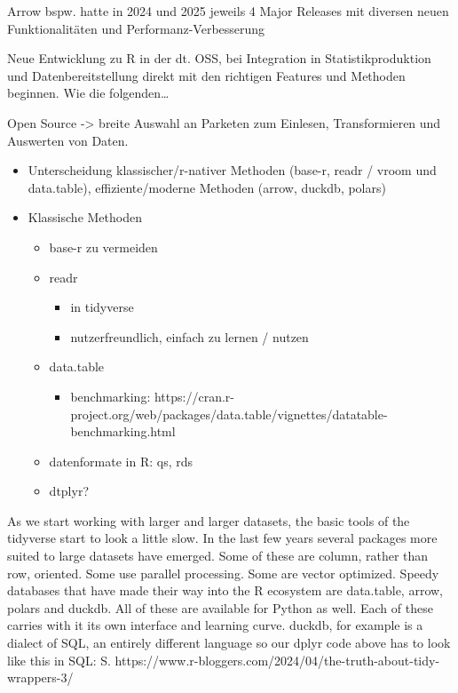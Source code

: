 \documentclass[
  german,
  10pt,
  twoside]{article}
\providecommand{\tightlist}{%
  \setlength{\itemsep}{0pt}\setlength{\parskip}{0pt}}
\begin{document}
Arrow bspw. hatte in 2024 und 2025 jeweils 4 Major Releases mit diversen
neuen Funktionalitäten und Performanz-Verbesserung

Neue Entwicklung zu R in der dt. OSS, bei Integration in
Statistikproduktion und Datenbereitstellung direkt mit den richtigen
Features und Methoden beginnen. Wie die folgenden\ldots{}

Open Source -\textgreater{} breite Auswahl an Parketen zum Einlesen,
Transformieren und Auswerten von Daten.

\begin{itemize}
\tightlist
\item
  Unterscheidung klassischer/r-nativer Methoden (base-r, readr / vroom
  und data.table), effiziente/moderne Methoden (arrow, duckdb, polars)
\item
  Klassische Methoden

  \begin{itemize}
  \tightlist
  \item
    base-r zu vermeiden
  \item
    readr

    \begin{itemize}
    \tightlist
    \item
      in tidyverse
    \item
      nutzerfreundlich, einfach zu lernen / nutzen
    \end{itemize}
  \item
    data.table

    \begin{itemize}
    \tightlist
    \item
      benchmarking:
      https://cran.r-project.org/web/packages/data.table/vignettes/datatable-benchmarking.html
    \end{itemize}
  \item
    datenformate in R: qs, rds
  \item
    dtplyr?
  \end{itemize}
\end{itemize}

As we start working with larger and larger datasets, the basic tools of
the tidyverse start to look a little slow. In the last few years several
packages more suited to large datasets have emerged. Some of these are
column, rather than row, oriented. Some use parallel processing. Some
are vector optimized. Speedy databases that have made their way into the
R ecosystem are data.table, arrow, polars and duckdb. All of these are
available for Python as well. Each of these carries with it its own
interface and learning curve. duckdb, for example is a dialect of SQL,
an entirely different language so our dplyr code above has to look like
this in SQL: S.
https://www.r-bloggers.com/2024/04/the-truth-about-tidy-wrappers-3/
\end{document}
